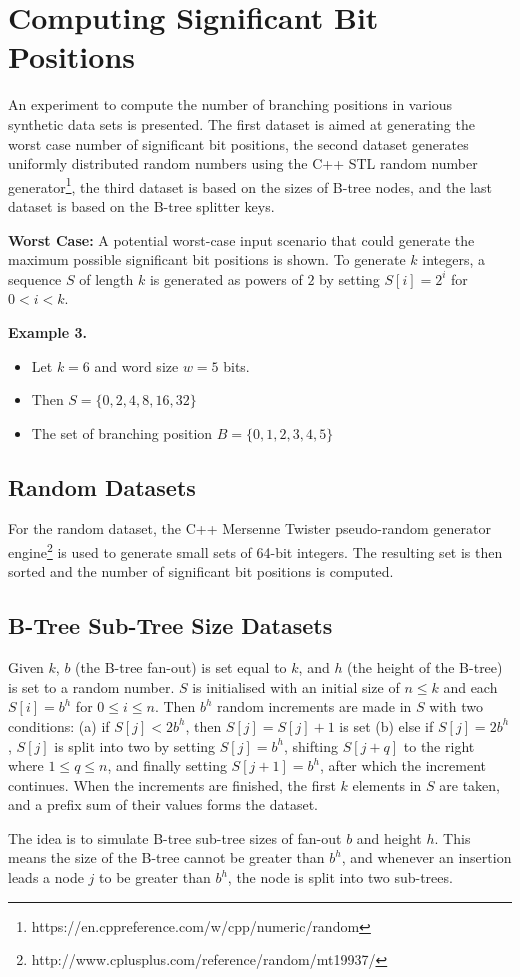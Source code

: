 \section{Computing Significant Bit Positions} \label{branchingbits}
An experiment to compute the number of branching positions in various synthetic data sets is presented. The first dataset is aimed at generating the worst case number of significant bit positions, the second dataset generates uniformly distributed random numbers using the C++ STL random number generator\footnote{https://en.cppreference.com/w/cpp/numeric/random}, the third dataset is based on the sizes of B-tree nodes, and the last dataset is based on the B-tree splitter keys.\par
\textbf{Worst Case:} A potential worst-case input scenario that could generate the maximum possible significant bit positions is shown. To generate $k$ integers, a sequence $S$ of length $k$ is generated as powers of $2$ by setting $S[i] = 2^i$ for $0 < i < k$.
\par
\textbf{Example 3.}
\begin{itemize}
    \item Let $k = 6$ and word size $w = 5$ bits.
    \item Then $S = \{0, 2, 4, 8, 16, 32\} $
    \item The set of branching position $B = \{ 0, 1, 2, 3, 4, 5 \}$
\end{itemize}
\par
\subsection{Random Datasets} For the random dataset, the C++ Mersenne Twister pseudo-random generator engine\footnote{http://www.cplusplus.com/reference/random/mt19937/} is used to generate small sets of 64-bit integers. The resulting set is then sorted and the number of significant bit positions is computed.
\par
\subsection{B-Tree Sub-Tree Size Datasets} Given $k$, $b$ (the B-tree fan-out) is set equal to $k$, and $h$ (the height of the B-tree) is set to a random number. $S$ is initialised with an initial size of $n \leq k$ and each $S[i] = b^h$ for $0 \leq i \leq n$. Then $b^h$ random increments are made in $S$ with two conditions: (a) if $S[j] < 2b^h$, then $S[j] = S[j] + 1$ is set (b) else if $S[j] = 2b^h$, $S[j]$ is split into two by setting $S[j] = b^h$, shifting $S[j+q]$ to the right where $1 \leq q \leq n$, and finally setting $S[j+1] = b^h$, after which the increment continues. When the increments are finished, the first $k$ elements in $S$ are taken, and a prefix sum of their values forms the dataset.\par
The idea is to simulate B-tree sub-tree sizes of fan-out $b$ and height $h$. This means the size of the B-tree cannot be greater than $b^h$, and whenever an insertion leads a node $j$ to be greater than $b^h$, the node is split into two sub-trees.
\par
